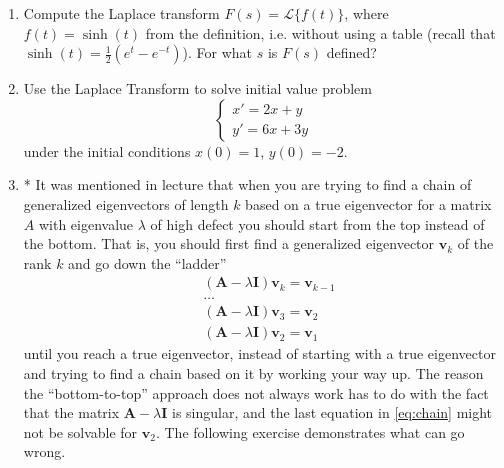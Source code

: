 \documentclass[11pt]{article}
\newcommand{\bA}{\mathbf{A}}
\newcommand{\bv}{\mathbf{v}}
\newcommand{\bI}{\mathbf{I}}
\newcommand{\calL}{\mathcal{L}}
\renewcommand{\l}{\lambda}
\begin{document}
\begin{enumerate}
\item Compute the Laplace transform $F(s)=\calL\{f(t)\}$, where $f(t)=\sinh(t)$ from the definition, i.e. without using a table (recall that $\sinh(t)=\frac{1}{2}(e^t-e^{-t})$).
For what $s$ is $F(s)$ defined?


\item Use the Laplace Transform to solve initial value problem
\begin{equation}
    \begin{cases}
        x'=2x+y\\
        y'=6x+3y
    \end{cases}
\end{equation}
under the initial conditions $x(0)=1$, $y(0)=-2$.
























\item * It was mentioned in lecture that when you are trying to find a chain of generalized eigenvectors of length $k$ based on a true eigenvector for a matrix $A$ with eigenvalue $\l$ of high defect you should start from the top instead of the bottom.
That is, you should first find a generalized eigenvector $\bv_k$ of the rank $k$ and go down the ``ladder''
\begin{equation}
        \label{eq:chain}
    \begin{aligned}
        &(\bA-\l \bI)\bv_{k}=\bv_{k-1}\\
        &\dots\\
        &(\bA-\l \bI)\bv_{3}=\bv_{2}\\
        &(\bA-\l \bI)\bv_{2}=\bv_{1}
    \end{aligned}
\end{equation} until you reach a true eigenvector, instead of starting with a true eigenvector and trying to find a chain based on it by working your way up.
The reason the ``bottom-to-top'' approach does not always work has to do with the fact that the matrix $\bA-\l\bI$ is singular, and the last equation in \eqref{eq:chain} might not be solvable for $\bv_2$.
The following exercise demonstrates what can go wrong.


\end{enumerate}
\end{document}
